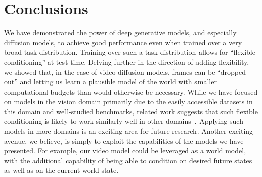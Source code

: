 \chapter{Conclusions}  \label{ch:conclusion}

We have demonstrated the power of deep generative models, and especially diffusion models, to achieve good performance even when trained over a very broad task distribution. Training over such a task distribution allows for ``flexible conditioning'' at test-time. Delving further in the direction of adding flexibility, we showed that, in the case of video diffusion models, frames can be ``dropped out'' and letting us learn a plausible model of the world with smaller computational budgets than would otherwise be necessary. While we have focused on models in the vision domain primarily due to the easily accessible datasets in this domain and well-studied benchmarks, related work suggests that such flexible conditioning is likely to work similarly well in other domains~\citep{weilbach2022graphically}. Applying such models in more domains is an exciting area for future research. Another exciting avenue, we believe, is simply to exploit the capabilities of the models we have presented. For example, our video model could be leveraged as a world model, with the additional capability of being able to condition on desired future states as well as on the current world state.